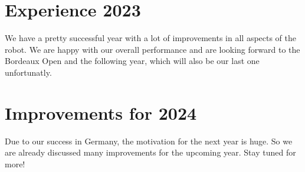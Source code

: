 \section{Experience 2023}
We have a pretty successful year with a lot of improvements in all aspects of the robot.
We are happy with our overall performance and are looking forward to the Bordeaux Open and the following year, 
which will also be our last one unfortunatly.
 
\section{Improvements for 2024}
Due to our success in Germany, the motivation for the next year is huge. So we are already discussed
many improvements for the upcoming year. 
\newline
Stay tuned for more!